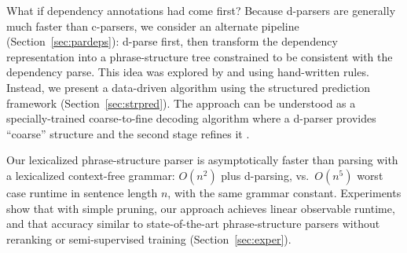 \documentclass[11pt,letterpaper]{article}
\newcommand{\lpkcomment}[1]{\textcolor{red}{\bf \small [#1 --lpk]}}
\begin{document}
What if dependency annotations had come first?  Because d-parsers are
generally much faster than c-parsers, we consider an alternate
pipeline (Section~\ref{sec:pardeps}): d-parse first, then transform the dependency representation
into a phrase-structure tree constrained to be consistent with the
dependency parse.  This idea was explored by   and
 using hand-written rules.  Instead, we present a data-driven
algorithm using the structured prediction framework (Section~\ref{sec:strpred}).  The approach can be
understood as a specially-trained coarse-to-fine
decoding algorithm where a d-parser provides ``coarse'' structure and
the second stage refines it \cite{charniak2005coarse,petrov2007improved}.

Our lexicalized phrase-structure parser is asymptotically faster than
parsing with a lexicalized context-free grammar: $O(n^2)$ plus
d-parsing, vs.~$O(n^5)$ worst case runtime in sentence length $n$,
with the same grammar constant.  Experiments show
that with simple pruning, our approach achieves linear observable
runtime, and that accuracy similar to
state-of-the-art phrase-structure parsers without reranking or
semi-supervised training (Section~\ref{sec:exper}).






\end{document}
